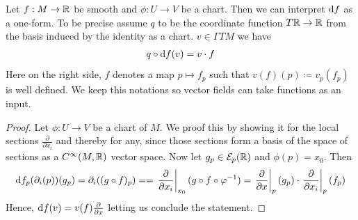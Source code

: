 \begin{corollary}\label{cor: Vectorfields hav funktions as inputs}
	Let $f:M\to \mathbb{R}$ be smooth and $\phi: U\to V$ be a chart. Then we can interpret $\mathop{}\!\mathrm{d} f$ as a one-form. To be precise assume $q$ to be the coordinate function $T\mathbb{R}\to \mathbb{R}$ from the basis induced by the identity as a chart. $v\in \Gamma TM$ we have
	\begin{align*}
		q\circ \mathop{}\!\mathrm{d} f(v)=v\cdot f
	\end{align*} Here on the right side, $f$ denotes a map $p\mapsto f_p$ such that $v(f)(p)\coloneq v_p(f_p)$ is well defined. We keep this notations so vector fields can take functions as an input.
\end{corollary}
\begin{proof} Let $\phi:U \to V$ be a chart of $M$. 
	We proof this by showing it for the local sections $\frac{\partial}{\partial x_i}$ and thereby for any, since those sections form a basis of the space of sections as a $C^{\infty}(M,\mathbb{R})$ vector space. Now let $g_p\in \mathcal{E}_p(\mathbb{R})$ and $\phi(p)=x_0$. Then
	\begin{equation*}
		\mathop{}\!\mathrm{d} f _p(\partial_i(p))(g_p)= \partial_i((g\circ f)_p)=
		=\left.\frac{\partial }{\partial x_i}\right|_{x_0}(g\circ f\circ \varphi^{-1})=\left.\frac{\partial }{\partial x}\right|_{p}(g_p) \cdot \left.\frac{\partial }{\partial x_i}\right|_{p}(f_p)
	\end{equation*}
	Hence, $\mathop{}\!\mathrm{d} f (v)=v(f)\frac{\partial }{\partial x}$ letting us conclude the statement.
\end{proof}


